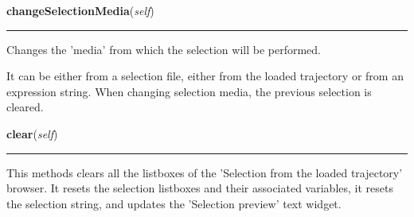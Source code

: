     \vspace{0.5ex}

\hspace{.8\funcindent}\begin{boxedminipage}{\funcwidth}

    \raggedright \textbf{changeSelectionMedia}(\textit{self})

    \vspace{-1.5ex}

    \rule{\textwidth}{0.5\fboxrule}
\setlength{\parskip}{2ex}
    Changes the 'media' from which the selection will be performed.

    It can be either from a selection file, either from the loaded 
    trajectory or from an expression string. When changing selection media,
    the previous selection is cleared.

\setlength{\parskip}{1ex}
    \end{boxedminipage}

    \label{nMOLDYN:GUI:SelectionDialog:SelectionDialog:clear}

    \vspace{0.5ex}

\hspace{.8\funcindent}\begin{boxedminipage}{\funcwidth}

    \raggedright \textbf{clear}(\textit{self})

    \vspace{-1.5ex}

    \rule{\textwidth}{0.5\fboxrule}
\setlength{\parskip}{2ex}
    This methods clears all the listboxes of the 'Selection from the loaded
    trajectory' browser. It resets the selection listboxes and their 
    associated variables, it resets the selection string, and updates the 
    'Selection preview' text widget.

\setlength{\parskip}{1ex}
    \end{boxedminipage}

    \label{nMOLDYN:GUI:SelectionDialog:SelectionDialog:buildSelectionString}

